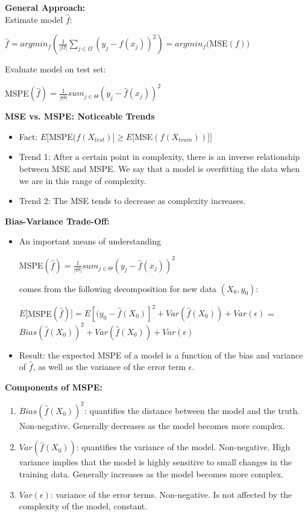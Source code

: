 \documentclass{article}
\begin{document}
\textbf{General Approach:}\\
Estimate model $\hat{f}$:
\begin{center}
$\hat{f} = argmin_{f}(\frac{1}{|\Omega|}\sum_{j \in \Omega}(y_{j} - f(x_{j}))^2) = argmin_{f}($MSE$(f))$
\end{center}
Evaluate model on test set:
\begin{center}
MSPE$(\hat{f}) = \frac{1}{|\Theta|}sum_{j \in \Theta}(y_{j} - \hat{f}(x_{j}))^2$\\
\end{center}
\textbf{MSE vs. MSPE: Noticeable Trends}
\begin{itemize}
    \item Fact: $E[$MSPE$(f(X_{test})] \geq E[$MSE$(f(X_{train}))]]$
    \item Trend 1: After a certain point in complexity, there is an inverse relationship between MSE and MSPE. We say that a model is overfitting the data when we are in this range of complexity.
    \item Trend 2: The MSE tends to decrease as complexity increases.
\end{itemize}
\textbf{Bias-Variance Trade-Off:}
\begin{itemize}
    \item An important means of understanding \begin{center}
        MSPE$(\hat{f}) = \frac{1}{|\Theta|}sum_{j \in \Theta}(y_{j} - \hat{f}(x_{j}))^2$
    \end{center} 
    comes from the following decomposition for new data $(X_{0}, y_{0})$: 
    \begin{center}
        $E[$MSPE$(\hat{f})] = E[(y_{0} - \hat{f}(X_{0})]^2 + Var(\hat{f}(X_{0})) + Var(\epsilon)$ = $Bias(\hat{f}(X_{0}))^2 + Var(\hat{f}(X_{0})) + Var(\epsilon)$
    \end{center}
    \item Result: the expected MSPE of a model is a function of the bias and variance of $\hat{f}$, as well as the variance of the error term $\epsilon$.
\end{itemize}
\textbf{Components of MSPE:}
\begin{enumerate}
    \item $Bias(\hat{f}(X_{0}))^2$: quantifies the distance between the model and the truth. Non-negative. Generally decreases as the model becomes more complex.
    \item $Var(\hat{f}(X_{0}))$: quantifies the variance of the model. Non-negative. High variance implies that the model is highly sensitive to small changes in the training data. Generally increases as the model becomes more complex.
    \item $Var(\epsilon)$: variance of the error terms. Non-negative. Is not affected by the complexity of the model, constant.
\end{enumerate}
\end{document}

